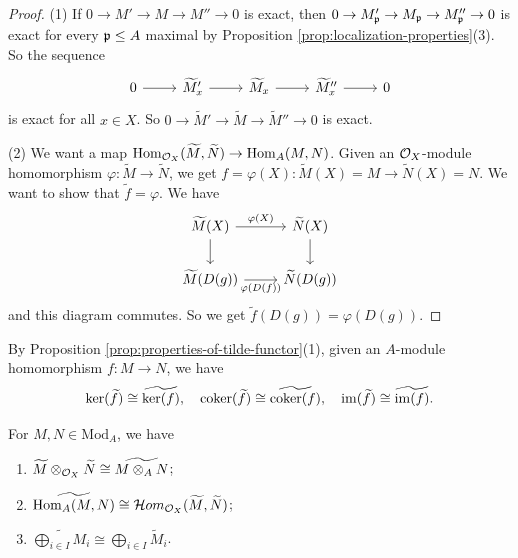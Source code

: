 \begin{proof}
  (1)  If $0 \to M' \to M \to M'' \to 0$
  is exact, then
  $0 \to M'_{\mathfrak{p}} \to M_{\mathfrak{p}} \to M''_{\mathfrak{p}} \to 0$
  is exact for every
  $\mathfrak{p} \le A$ maximal by
  Proposition \ref{prop:localization-properties}(3).
  So the sequence
  \[
    \begin{tikzcd}
      0 \ar[r] & \widetilde{M}'_x
      \ar[r] & \widetilde{M}_x
      \ar[r] & \widetilde{M}''_x
      \ar[r] & 0
    \end{tikzcd}
  \]
  is exact for all
  $x \in X$. So
  $0 \to \widetilde{M}' \to \widetilde{M} \to \widetilde{M}'' \to 0$
  is exact.

  (2) We want a map
  $\operatorname{Hom}_{\mathcal{O}_X}(\widetilde{M}, \widetilde{N}) \to \operatorname{Hom}_A(M, N)$.
  Given an $\mathcal{O}_X$-module
  homomorphism
  $\varphi : \widetilde{M} \to \widetilde{N}$,
  we get
  $f = \varphi(X) : \widetilde{M}(X) = M \to \widetilde{N}(X) = N$.
  We want to show that
  $\widetilde{f} = \varphi$. We have
  \[
    \begin{tikzcd}
      \widetilde{M}(X)
      \ar[r, "\varphi(X)"] \ar[d]
      & \widetilde{N}(X) \ar[d] \\
      \widetilde{M}(D(g))
      \ar[r, "\varphi(D(f))", swap]
      & \widetilde{N}(D(g))
    \end{tikzcd}
  \]
  and this diagram commutes.
  So we get $\widetilde{f}(D(g)) = \varphi(D(g))$.
\end{proof}

\begin{remark}
  By
  Proposition \ref{prop:properties-of-tilde-functor}(1),
  given an $A$-module
  homomorphism $f : M \to N$, we have
  \[
    \ker(\widetilde{f})
    \cong \widetilde{\ker(f)},
    \quad \operatorname{coker}(\widetilde{f})
    \cong \widetilde{\operatorname{coker}(f)},
    \quad \operatorname{im}(\widetilde{f})
    \cong \widetilde{\operatorname{im}(f)}.
  \]
\end{remark}

\begin{prop}
  For $M, N \in \mathrm{Mod}_A$,
  we have
  \begin{enumerate}
    \item $\widetilde{M} \otimes_{\mathcal{O}_X} \widetilde{N}
      \cong \widetilde{M \otimes_A N}$;
    \item $\widetilde{\operatorname{Hom}_A(M, N)}
      \cong \mathcal{H}om_{\mathcal{O}_X}(\widetilde{M}, \widetilde{N})$;
    \item $\widetilde{\bigoplus_{i \in I} M_i}
      \cong \bigoplus_{i \in I} \widetilde{M}_i$.
  \end{enumerate}
\end{prop}

